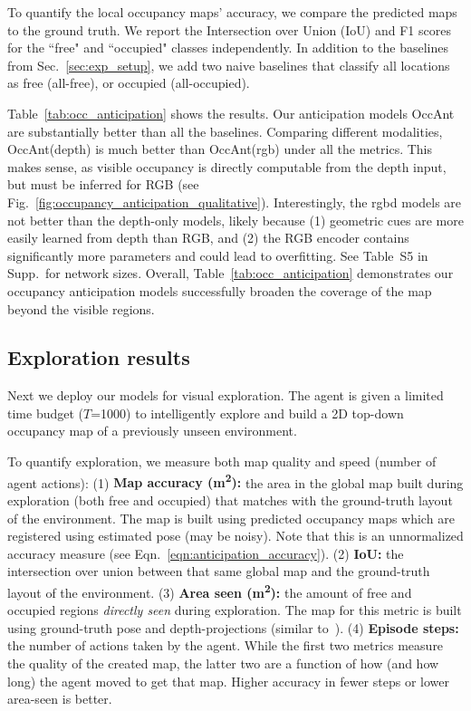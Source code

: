 \documentclass[runningheads]{llncs}
\begin{document}
To quantify the local occupancy maps' accuracy, we compare the predicted maps to the ground truth. We report the Intersection over Union (IoU) and F1 scores for the ``free" and ``occupied" classes independently. In addition to the baselines from Sec.~\ref{sec:exp_setup}, we add two naive baselines that classify all locations as free (all-free), or occupied (all-occupied). 

Table~\ref{tab:occ_anticipation} shows the results.  Our anticipation models OccAnt are substantially better than all the baselines.  Comparing different modalities, OccAnt(depth) is much better than OccAnt(rgb) under all the metrics. This makes sense, as visible occupancy is directly computable from the depth input, but must be inferred for RGB (see Fig.~\ref{fig:occupancy_anticipation_qualitative}). Interestingly, the rgbd models are not better than the depth-only models, likely because (1) geometric cues are more easily learned from depth than RGB, and (2) the RGB encoder contains significantly more parameters and could lead to overfitting.  See Table~S5 in Supp.~for network sizes. Overall, Table~\ref{tab:occ_anticipation} demonstrates our occupancy anticipation models successfully broaden the coverage of the map beyond the visible regions. 



\subsection{Exploration results}\label{sec:exp_exploration}

Next we deploy our models for visual exploration. The agent is given a limited time budget ($T$=1000) to intelligently explore and build a 2D top-down occupancy map of a previously unseen environment. 

To quantify exploration, we measure both map quality and speed (number of agent actions):
(1) \textbf{Map accuracy (\si{m^2}):} the area in the global map built during exploration (both free and occupied) that matches with the ground-truth layout of the environment. The map is built using predicted occupancy maps which are registered using estimated pose (may be noisy). Note that this is an unnormalized accuracy measure (see Eqn.~\ref{eqn:anticipation_accuracy}). (2) \textbf{IoU:} the intersection over union between that same global map and the ground-truth layout of the environment. (3) \textbf{Area seen (\si{m^2}):} the amount of free and occupied regions \emph{directly seen} during exploration. The map for this metric is built using ground-truth pose and depth-projections (similar to~\cite{chen2019learning,chaplot2020learning}). (4) \textbf{Episode steps:} the number of actions taken by the agent. While the first two metrics measure the quality of the created map, the latter two are a function of how (and how long) the agent moved to get that map. Higher accuracy in fewer steps or lower area-seen is better.\\
\end{document}

